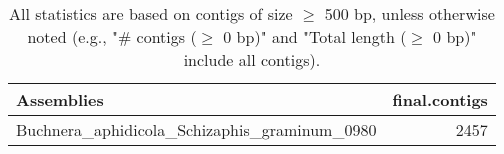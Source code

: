 \documentclass[12pt,a4paper]{article}
\begin{document}
\begin{table}[ht]
\begin{center}
\caption{All statistics are based on contigs of size $\geq$ 500 bp, unless otherwise noted (e.g., "\# contigs ($\geq$ 0 bp)" and "Total length ($\geq$ 0 bp)" include all contigs).}
\begin{tabular}{|l*{1}{|r}|}
\hline
Assemblies & final.contigs \\ \hline
Buchnera\_aphidicola\_Schizaphis\_graminum\_0980 & 2457 \\ \hline
\end{tabular}
\end{center}
\end{table}
\end{document}
